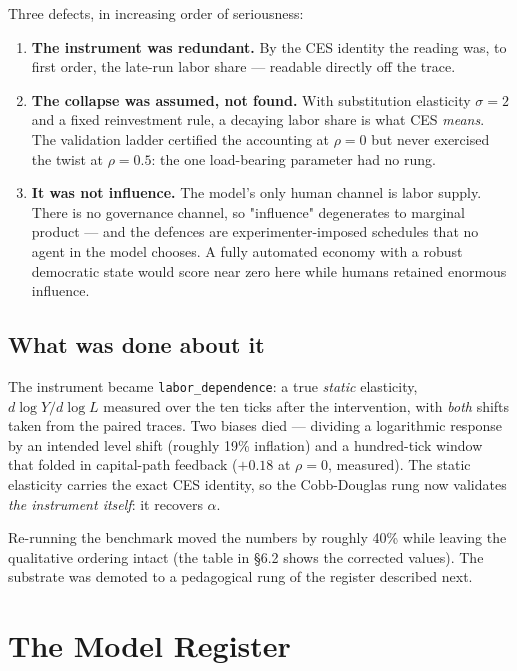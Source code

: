 \documentclass[11pt]{article}
\begin{document}
\noindent Three defects, in increasing order of seriousness:

\begin{enumerate}\itemsep3pt
\item \textbf{The instrument was redundant.} By the CES identity the reading was, to first
      order, the late-run labor share --- readable directly off the trace.
\item \textbf{The collapse was assumed, not found.} With substitution elasticity
      $\sigma = 2$ and a fixed reinvestment rule, a decaying labor share is what CES
      \emph{means}. The validation ladder certified the accounting at $\rho = 0$ but never
      exercised the twist at $\rho = 0.5$: the one load-bearing parameter had no rung.
\item \textbf{It was not influence.} The model's only human channel is labor supply. There
      is no governance channel, so "influence" degenerates to marginal product --- and the
      defences are experimenter-imposed schedules that no agent in the model chooses. A
      fully automated economy with a robust democratic state would score near zero here
      while humans retained enormous influence.
\end{enumerate}

\subsection{What was done about it}

The instrument became \texttt{labor\_dependence}: a true \emph{static}
elasticity, $d\log Y / d\log L$ measured over the ten ticks after the intervention, with
\emph{both} shifts taken from the paired traces. Two biases died --- dividing a logarithmic
response by an intended level shift (roughly 19\% inflation) and a hundred-tick window that
folded in capital-path feedback ($+0.18$ at $\rho = 0$, measured). The static elasticity
carries the exact CES identity, so the Cobb-Douglas rung now validates \emph{the instrument
itself}: it recovers $\alpha$.

Re-running the benchmark moved the numbers by roughly 40\% while leaving the qualitative
ordering intact (the table in \S6.2 shows the corrected values). The substrate was demoted
to a pedagogical rung of the register described next.

\section{The Model Register}
\end{document}

